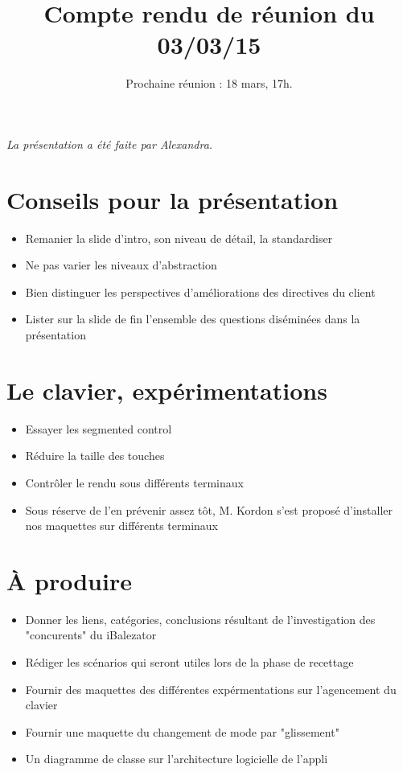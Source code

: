 \documentclass{scrartcl}
\begin{document}

\title{Compte rendu de réunion du 03/03/15}
\subtitle{Prochaine réunion : 18 mars, 17h.\vspace{-5ex}}
\date{}
\maketitle

\textit{La présentation a été faite par Alexandra.}

\section{Conseils pour la présentation}
\begin{itemize}
	\item  Remanier la slide d'intro, son niveau de détail, la standardiser
	\item  Ne pas varier les niveaux d'abstraction
	\item  Bien distinguer les perspectives d'améliorations des directives du client
	\item  Lister sur la slide de fin l'ensemble des questions diséminées dans la présentation
\end{itemize}

\section{Le clavier, expérimentations}
\begin{itemize}
	\item  Essayer les segmented control
	\item  Réduire la taille des touches
	\item  Contrôler le rendu sous différents terminaux
	\item  Sous réserve de l'en prévenir assez tôt, M. Kordon s'est proposé d'installer nos maquettes sur différents terminaux
\end{itemize}

\section{À produire}
\begin{itemize}
	\item  Donner les liens, catégories, conclusions résultant de l'investigation des "concurents" du iBalezator
	\item  Rédiger les scénarios qui seront utiles lors de la phase de recettage
	\item  Fournir des maquettes des différentes expérmentations sur l'agencement du clavier
	\item  Fournir une maquette du changement de mode par "glissement"
	\item  Un diagramme de classe sur l'architecture logicielle de l'appli
\end{itemize}
\end{document}
